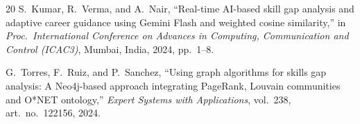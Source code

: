 \documentclass[12pt,a4paper]{report}
\begin{document}
\begin{thebibliography}{20}
S.~Kumar, R.~Verma, and A.~Nair,
``Real-time AI-based skill gap analysis and adaptive career guidance using Gemini Flash and weighted cosine similarity,''
in \textit{Proc.\ International Conference on Advances in Computing, Communication and Control (ICAC3)}, Mumbai, India, 2024, pp.~1--8.

G.~Torres, F.~Ruiz, and P.~Sanchez,
``Using graph algorithms for skills gap analysis: A Neo4j-based approach integrating PageRank, Louvain communities and O*NET ontology,''
\textit{Expert Systems with Applications}, vol.~238, art.\ no.\ 122156, 2024.

\end{thebibliography}
\end{document}
